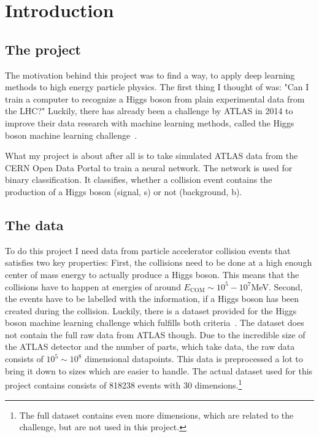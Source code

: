 \section{Introduction}\label{sec:intro}

\subsection{The project}\label{subsec:intro:project}

The motivation behind this project was to find a way, to apply deep learning methods to high energy particle physics.
The first thing I thought of was: "Can I train a computer to recognize a Higgs boson from plain experimental data from
the LHC?"
Luckily, there has already been a challenge by ATLAS in 2014 to improve their data research with machine learning
methods, called the Higgs boson machine learning challenge~\cite{adam2014learning}.

What my project is about after all is to take simulated ATLAS data from the CERN Open Data Portal to train a neural network.
The network is used for binary classification.
It classifies, whether a collision event contains the production of a Higgs boson (signal, s) or not (background, b).

\subsection{The data}\label{subsec:intro:data}

To do this project I need data from particle accelerator collision events that satisfies two key properties:
First, the collisions need to be done at a high enough center of mass energy to actually produce a Higgs boson.
This means that the collisions have to happen at energies of around $E_\text{COM}\sim 10^5 - 10^7$\;MeV.
Second, the events have to be labelled with the information, if a Higgs boson has been created during the collision.
Luckily, there is a dataset provided for the Higgs boson machine learning challenge which fulfills both criteria~\cite{atlas2014dataset}.
The dataset does not contain the full raw data from ATLAS though.
Due to the incredible size of the ATLAS detector and the number of parts, which take data, the raw data consists of $10^5 \sim 10^8$ dimensional datapoints.
This data is preprocessed a lot to bring it down to sizes which are easier to handle.
The actual dataset used for this project contains consists of 818238 events with 30 dimensions.\footnote{The full dataset contains even more dimensions, which are related to the challenge, but are not used in this project.}

